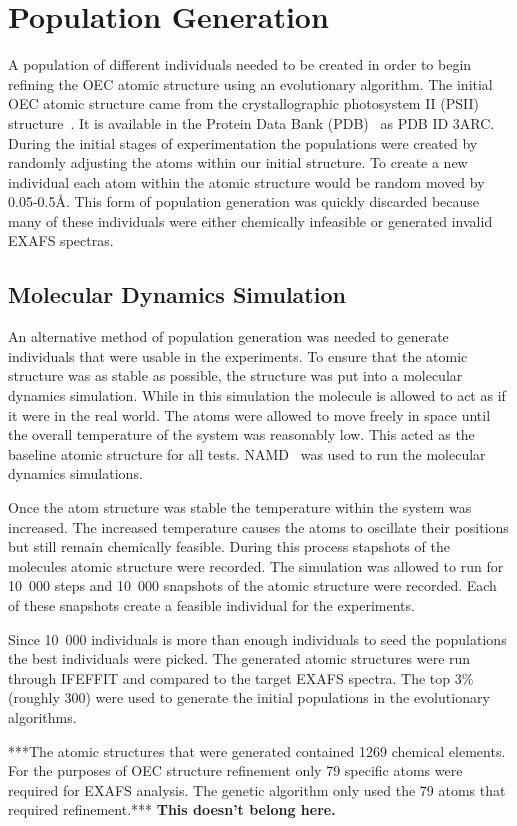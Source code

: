 \section{Population Generation}

A population of different individuals needed to be created in order to begin refining the OEC atomic structure using an evolutionary algorithm. The initial OEC atomic structure came from the crystallographic photosystem II (PSII) structure~\cite{umena2011crystal}. It is available in the Protein Data Bank (PDB)~\cite{databank} as PDB ID 3ARC. During the initial stages of experimentation the populations were created by randomly adjusting the atoms within our initial structure. To create a new individual each atom within the atomic structure would be random moved by 0.05-0.5\AA. This form of population generation was quickly discarded because many of these individuals were either chemically infeasible or generated invalid EXAFS spectras. 

\subsection{Molecular Dynamics Simulation}

An alternative method of population generation was needed to generate individuals that were usable in the experiments. To ensure that the atomic structure was as stable as possible, the structure was put into a molecular dynamics simulation. While in this simulation the molecule is allowed to act as if it were in the real world. The atoms were allowed to move freely in space until the overall temperature of the system was reasonably low. This acted as the baseline atomic structure for all tests. NAMD~\cite{namd} was used to run the molecular dynamics simulations.

Once the atom structure was stable the temperature within the system was increased. The increased temperature causes the atoms to oscillate their positions but still remain chemically feasible. During this process stapshots of the molecules atomic structure were recorded. The simulation was allowed to run for 10\ 000 steps and 10\ 000 snapshots of the atomic structure were recorded. Each of these snapshots create a feasible individual for the experiments.

Since 10\ 000 individuals is more than enough individuals to seed the populations the best individuals were picked. The generated atomic structures were run through IFEFFIT and compared to the target EXAFS spectra. The top 3\% (roughly 300) were used to generate the initial populations in the evolutionary algorithms.

***The atomic structures that were generated contained 1269 chemical elements. For the purposes of OEC structure refinement only 79 specific atoms were required for EXAFS analysis. The genetic algorithm only used the 79 atoms that required refinement.*** \textbf{This doesn't belong here.}